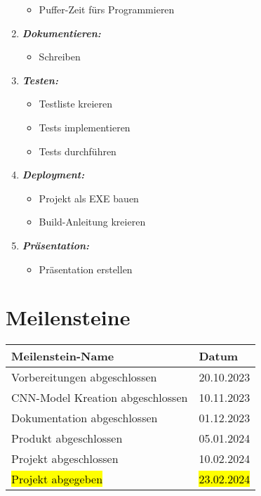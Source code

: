 \begin{enumerate}
\begin{itemize}
		\item Puffer-Zeit fürs Programmieren 
	\end{itemize} 
	\item \textbf{\emph{Dokumentieren:}} 
	\begin{itemize} 
		\item Schreiben 
	\end{itemize} 
	\item \textbf{\emph{Testen:}} 
	\begin{itemize} 
		\item Testliste kreieren 
		\item Tests implementieren 
		\item Tests durchführen 
	\end{itemize} 
	\item \textbf{\emph{Deployment:}} 
	\begin{itemize} 
		\item Projekt als EXE bauen 
		\item Build-Anleitung kreieren 
	\end{itemize} 
	\item \textbf{\emph{Präsentation:}} 
	\begin{itemize} 
		\item Präsentation erstellen 
	\end{itemize}
\end{enumerate} 
\section{Meilensteine} 
\label{sec:PlanungMeilensteine} 

\begin{xltabular}{\linewidth}{|X|X|} 
	\hline Meilenstein-Name & Datum 
	\\\hline Vorbereitungen abgeschlossen & 20.10.2023 
	\\\hline CNN-Model Kreation abgeschlossen & 10.11.2023 
	\\\hline Dokumentation abgeschlossen & 01.12.2023 
	\\\hline Produkt abgeschlossen & 05.01.2024 
	\\\hline Projekt abgeschlossen & 10.02.2024 
	\\\hline \hl{Projekt abgegeben} & \hl{23.02.2024} 
	\\\hline 
\end{xltabular}

\label{tab:PlanungMeilensteineTable}

